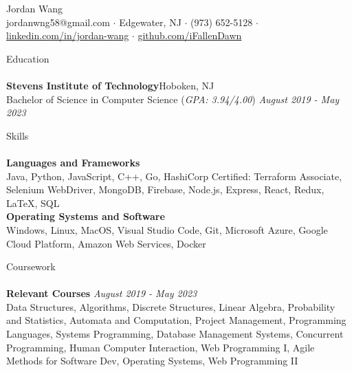 \documentclass[10pt]{article}
\newcommand{\lineunder} {
    \vspace*{-8pt} \\
    \hspace*{-18pt} \hrulefill \\
}
\newcommand{\header}[1]{
    {\hspace*{-18pt}\vspace*{6pt} #1}
    \vspace*{-6pt} \lineunder
}
\begin{document}
\vspace*{-40pt}

    

\vspace*{2pt}
\begin{center}
	{\Huge {Jordan Wang}}\\
	\vspace{2mm}
	jordanwng58@gmail.com $\cdot$ Edgewater, NJ $\cdot$ (973) 652-5128 $\cdot$ \href{https://www.linkedin.com/in/jordan-wang/}{linkedin.com/in/jordan-wang} $\cdot$ \href{https://github.com/iFallenDawn}{github.com/iFallenDawn} \\
\end{center}
\vspace{-2mm}
\header{Education}
\textbf{Stevens Institute of Technology}\hfill Hoboken, NJ\\
Bachelor of Science in Computer Science (\textit{GPA: 3.94/4.00}) \hfill \textit{August 2019 - May 2023}\\
\vspace{2mm}

\header{Skills}
{\textbf{Languages and Frameworks}} \hfill 
\\
	Java, Python, JavaScript, C++, Go, HashiCorp Certified: Terraform Associate, Selenium WebDriver, MongoDB, Firebase, Node.js, Express, React, Redux, \LaTeX, SQL
 \\
\vspace{1mm}
 {\textbf{Operating Systems and Software}} \hfill 
 \\
 Windows, Linux, MacOS, Visual Studio Code, Git, Microsoft Azure, Google Cloud Platform, Amazon Web Services, Docker
\vspace{2mm}

\header{Coursework}
{\textbf{Relevant Courses}} {\sl August 2019 - May 2023} \hfill 
\\
Data Structures, Algorithms, Discrete Structures, Linear Algebra, Probability and Statistics, Automata and Computation, Project Management, Programming Languages, Systems Programming, Database Management Systems, Concurrent Programming, Human Computer Interaction, Web Programming I, Agile Methods for Software Dev, Operating Systems, Web Programming II\\
\vspace{2mm}
\end{document}
